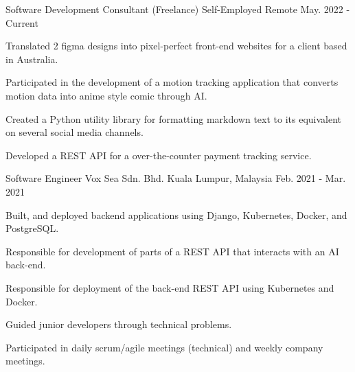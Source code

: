 

\begin{cventries}

\cventry
  {Software Development Consultant (Freelance)} %
  {Self-Employed} %
  {Remote} %
  {May. 2022 - Current} %
  {
    \begin{cvitems} %
      \item {Translated 2 figma designs into pixel-perfect front-end websites for a client based in Australia.}
      \item {Participated in the development of a motion tracking application that converts motion data into anime style comic through AI.}
      \item {Created a Python utility library for formatting markdown text to its equivalent on several social media channels.}
      \item {Developed a REST API for a over-the-counter payment tracking service.}
    \end{cvitems}
  }

  \cventry
    {Software Engineer} %
    {Vox Sea Sdn. Bhd.} %
    {Kuala Lumpur, Malaysia} %
    {Feb. 2021 - Mar. 2021} %
    {
      \begin{cvitems} %
        \item {Built, and deployed backend applications using Django, Kubernetes, Docker, and PostgreSQL.}
        \item {Responsible for development of parts of a REST API that interacts with an AI back-end.}
        \item {Responsible for deployment of the back-end REST API using Kubernetes and Docker.}
        \item {Guided junior developers through technical problems.}
        \item {Participated in daily scrum/agile meetings (technical) and weekly company meetings.}
      \end{cvitems}
    }


\end{cventries}
